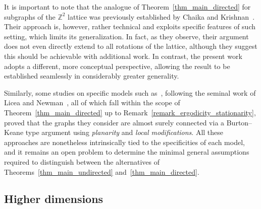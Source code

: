 \documentclass[a4paper, 11pt]{article} %
\theoremstyle{plain}
\newcommand{\Z}{\mathbb{Z}}
\newcommand{\1}{\mathds 1}
\numberwithin{equation}{section}
\begin{document}
It is important to note that the analogue of Theorem~\ref{thm_main_directed} for subgraphs of the $\Z^2$ lattice was previously established by Chaika and Krishnan~\cite{lattice_setting}. Their approach is, however, rather technical and exploits specific features of such setting, which limits its generalization. In fact, as they observe, their argument does not even directly extend to all rotations of the lattice, although they suggest this should be achievable with additional work. In contrast, the present work adopts a different, more conceptual perspective, allowing the result to be established seamlessly in considerably greater generality.

Similarly, some studies on specific models such as~\cite{competition_interface, coalescence_dsf}, following the seminal work of Licea and Newman~\cite{licea_and_newman}, all of which fall within the scope of Theorem~\ref{thm_main_directed} up to Remark~\ref{remark_ergodicity_stationarity}, proved that the graphs they consider are almost surely connected via a Burton–Keane type argument using \emph{planarity} and \emph{local modifications}. All these approaches are nonetheless intrinsically tied to the specificities of each model, and it remains an open problem to determine the minimal general assumptions required to distinguish between the alternatives of Theorems~\ref{thm_main_undirected} and~\ref{thm_main_directed}.


\subsection*{Higher dimensions}
\end{document}
